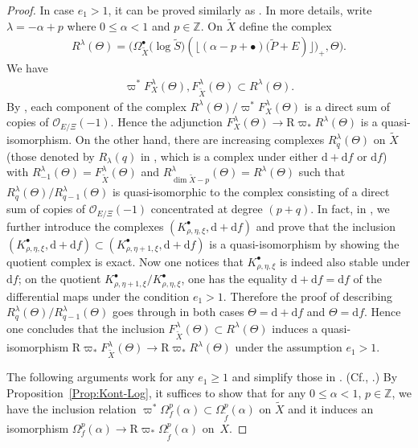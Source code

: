\documentclass[11pt]{article}
\newcommand{\ZZ}{\mathbb{Z}}
\newcommand{\sO}{\mathscr{O}}
\newcommand{\de}{\mathrm{d}}
\newcommand{\ddRH}{\Theta}
\newcommand{\flr}[1]{\lfloor #1 \rfloor}
\newcommand{\RD}{\mathrm{R}}
\begin{document}
\begin{proof}
In case $e_1 >1$, it can be proved similarly as \cite[Proposition~4.4]{Y}. In more details, write $\lambda = -\alpha+p$ where $0\leq\alpha <1$ and $p\in\ZZ$. On $\widetilde{X}$ define the complex
\begin{gather*} R^\lambda(\ddRH) = \big(\Omega_{\widetilde{X}}^\bullet\big(\log \widetilde{S}\big)(\flr{(\alpha -p+\bullet )\big(\widetilde{P}+E)}\big)_+, \ddRH \big). \end{gather*}
We have
\begin{gather*} \varpi^*F_X^\lambda(\ddRH), F_{\widetilde{X}}^\lambda(\ddRH) \subset R^\lambda(\ddRH). \end{gather*}
By \cite[Proposition~4.4(i)]{Y}, each component of the complex $R^\lambda(\ddRH)/\varpi^*F_X^\lambda(\ddRH)$ is a direct sum of copies of $\sO_{E/\Xi}(-1)$. Hence the adjunction $F_X^\lambda(\ddRH) \to \RD\varpi_*R^\lambda(\ddRH)$ is a quasi-isomorphism. On the other hand, there are increasing complexes $R^\lambda_q(\ddRH)$ on $\widetilde{X}$ (those denoted by $R_\lambda(q)$ in \cite[equation~(27)]{Y}, which is a complex under either $\de +\de f$ or $\de f$) with $R^\lambda_{-1}(\ddRH) = F^\lambda_{\widetilde{X}}(\ddRH)$ and $R^\lambda_{\dim \widetilde{X} -p}(\ddRH) = R^\lambda(\ddRH)$ such that $R^\lambda_q(\ddRH)/R^\lambda_{q-1}(\ddRH)$
is quasi-isomorphic to the complex consisting of a direct sum of copies of $\sO_{E/\Xi}(-1)$ concentrated at degree $(p+q)$. In fact, in \cite[Lemma~4.5]{Y}, we further introduce the complexes $(K_{\rho,\eta,\xi}^\bullet, \de +\de f)$ and prove that the inclusion $(K_{\rho,\eta,\xi}^\bullet, \de +\de f) \subset (K_{\rho,\eta+1,\xi}^\bullet, \de +\de f)$ is a quasi-isomorphism by showing the quotient complex is exact. Now
one notices that $K_{\rho,\eta,\xi}^\bullet$ is indeed also stable under $\de f$; on the quotient $K_{\rho,\eta+1,\xi}^\bullet/K_{\rho,\eta,\xi}^\bullet$, one has the equality $\de +\de f = \de f$ of the differential maps
under the condition $e_1>1$. Therefore the proof of \cite[Proposition~4.4(ii)]{Y} describing $R^\lambda_q(\ddRH)/R^\lambda_{q-1}(\ddRH)$ goes through in both cases $\ddRH = \de +\de f$ and $\ddRH = \de f$. Hence one concludes that the inclusion $F_{\widetilde{X}}^\lambda(\ddRH) \subset R^\lambda(\ddRH)$ induces a quasi-isomorphism $\RD\varpi_*F_{\widetilde{X}}^\lambda(\ddRH) \to \RD\varpi_*R^\lambda(\ddRH)$ under the assumption $e_1>1$.

The following arguments work for any $e_1\geq 1$ and simplify those in \cite[Section~4($b$)]{Y}. (Cf., \cite[Lemma 2.12(b)]{KKP}.) By Proposition~\ref{Prop:Kont-Log}, it suffices to show that for any $0\leq\alpha <1$, $p\in\ZZ$, we have the inclusion relation $\varpi^*\Omega_f^p(\alpha) \subset \Omega_{\tilde{f}}^p(\alpha)$ on $\widetilde{X}$ and it induces an isomorphism $\Omega_f^p(\alpha) \to \RD\varpi_*\Omega_{\tilde{f}}^p(\alpha)$ on~$X$.


\end{proof}
\end{document}
